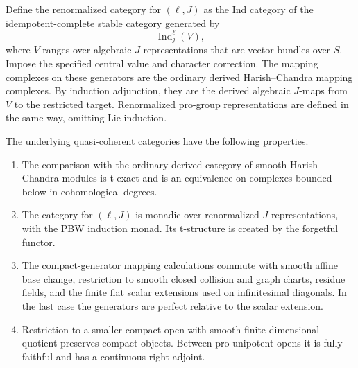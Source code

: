 Define the renormalized category for $(\ell,J)$ as the Ind category
of the idempotent-complete stable category generated by
\begin{equation}\label{eq:L2}
                       \operatorname{Ind}_{j}^{\ell}(V),
\end{equation}
where $V$ ranges over algebraic $J$-representations that are vector
bundles over $S$.  Impose the specified central value and character
correction.  The mapping complexes on these generators are the
ordinary derived Harish--Chandra mapping complexes.  By induction
adjunction, they are the derived algebraic $J$-maps from $V$ to the
restricted target.  Renormalized pro-group representations are defined
in the same way, omitting Lie induction.

\begin{proposition}\label{loop:hc-renormalization}
The underlying quasi-coherent categories have the following properties.
\begin{enumerate}
\item The comparison with the ordinary derived category of smooth
Harish--Chandra modules is t-exact and is an equivalence on complexes
bounded below in cohomological degrees.
\item The category for $(\ell,J)$ is monadic over renormalized
$J$-representations, with the PBW induction monad.  Its t-structure is
created by the forgetful functor.
\item The compact-generator mapping calculations commute with smooth
affine base change, restriction to smooth closed collision and graph
charts, residue fields, and the finite flat scalar
extensions used on infinitesimal diagonals.  In the last case the
generators are perfect relative to the scalar extension.
\item Restriction to a smaller compact open with smooth finite-dimensional
quotient preserves compact objects.  Between pro-unipotent opens it
is fully faithful and has a continuous right adjoint.
\end{enumerate}
\end{proposition}

